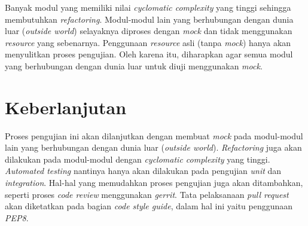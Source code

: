 Banyak modul yang memiliki nilai \emph{cyclomatic complexity} yang
tinggi sehingga membutuhkan \emph{refactoring}. Modul-modul lain yang
berhubungan dengan dunia luar (\emph{outside world}) selayaknya
diproses dengan \emph{mock} dan tidak menggunakan \emph{resource} yang
sebenarnya. Penggunaan \emph{resource} asli (tanpa \emph{mock}) hanya
akan menyulitkan proses pengujian. Oleh karena itu, diharapkan agar
semua modul yang berhubungan dengan dunia luar untuk diuji menggunakan
\emph{mock}.

\section{Keberlanjutan}

Proses pengujian ini akan dilanjutkan dengan membuat \emph{mock} pada
modul-modul lain yang berhubungan dengan dunia luar (\emph{outside
  world}). \emph{Refactoring} juga akan dilakukan pada modul-modul
dengan \emph{cyclomatic complexity} yang tinggi. \emph{Automated
  testing} nantinya hanya akan dilakukan pada pengujian \emph{unit}
dan \emph{integration}. Hal-hal yang memudahkan proses pengujian juga
akan ditambahkan, seperti proses \emph{code review} menggunakan
\emph{gerrit}. Tata pelaksanaan \emph{pull request} akan diketatkan
pada bagian \emph{code style guide}, dalam hal ini yaitu penggunaan
\emph{PEP8}.


